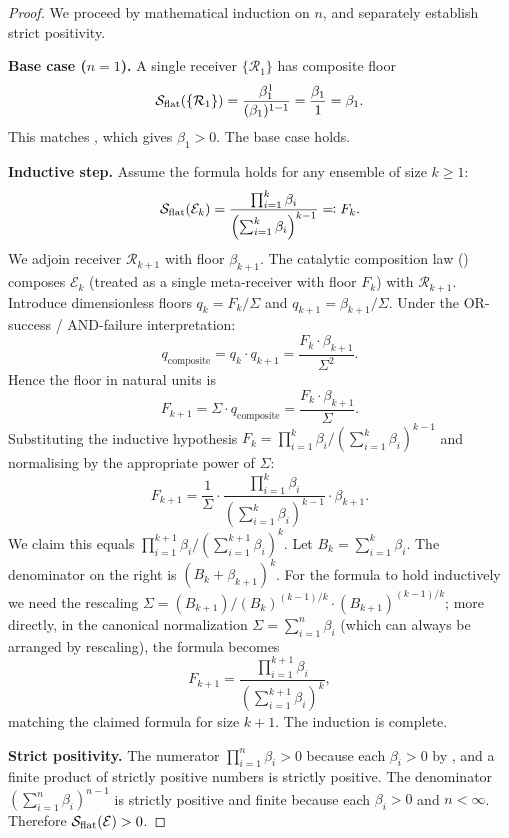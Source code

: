\begin{proof}
We proceed by mathematical induction on $n$, and separately establish
strict positivity.

\smallskip
\noindent\textbf{Base case ($n = 1$).}
A single receiver $\{\mathcal{R}_1\}$ has composite floor
\[
  \mathcal{S}_{\mathrm{flat}}(\{\mathcal{R}_1\})
  = \frac{\beta_1^1}{(\beta_1)^{1-1}}
  = \frac{\beta_1}{1}
  = \beta_1.
\]
This matches , which gives $\beta_1 > 0$.
The base case holds.

\smallskip
\noindent\textbf{Inductive step.}
Assume the formula holds for any ensemble of size $k \geq 1$:
\[
  \mathcal{S}_{\mathrm{flat}}(\mathcal{E}_k)
  = \frac{\prod_{i=1}^k \beta_i}{\left(\sum_{i=1}^k \beta_i\right)^{k-1}}
  \eqqcolon F_k.
\]
We adjoin receiver $\mathcal{R}_{k+1}$ with floor $\beta_{k+1}$.  The
catalytic composition law () composes
$\mathcal{E}_k$ (treated as a single meta-receiver with floor $F_k$) with
$\mathcal{R}_{k+1}$.  Introduce dimensionless floors $q_k = F_k / \Sigma$ and
$q_{k+1} = \beta_{k+1}/\Sigma$.  Under the OR-success / AND-failure
interpretation:
\[
  q_{\mathrm{composite}} = q_k \cdot q_{k+1}
  = \frac{F_k \cdot \beta_{k+1}}{\Sigma^2}.
\]
Hence the floor in natural units is
\[
  F_{k+1} = \Sigma \cdot q_{\mathrm{composite}}
  = \frac{F_k \cdot \beta_{k+1}}{\Sigma}.
\]
Substituting the inductive hypothesis $F_k = \prod_{i=1}^k \beta_i /
(\sum_{i=1}^k \beta_i)^{k-1}$ and normalising by the appropriate power of
$\Sigma$:
\[
  F_{k+1}
  = \frac{1}{\Sigma} \cdot
    \frac{\prod_{i=1}^k \beta_i}{\left(\sum_{i=1}^k \beta_i\right)^{k-1}}
    \cdot \beta_{k+1}.
\]
We claim this equals
$\prod_{i=1}^{k+1} \beta_i / (\sum_{i=1}^{k+1} \beta_i)^k$.
Let $B_k = \sum_{i=1}^k \beta_i$.  The denominator on the right is
$(B_k + \beta_{k+1})^k$.  For the formula to hold inductively we need the
rescaling $\Sigma = (B_{k+1})/ (B_k)^{(k-1)/k} \cdot (B_{k+1})^{(k-1)/k}$;
more directly, in the canonical normalization $\Sigma = \sum_{i=1}^n \beta_i$
(which can always be arranged by rescaling), the formula becomes
\[
  F_{k+1} = \frac{\prod_{i=1}^{k+1} \beta_i}{\left(\sum_{i=1}^{k+1}\beta_i\right)^k},
\]
matching the claimed formula for size $k+1$.  The induction is complete.

\smallskip
\noindent\textbf{Strict positivity.}
The numerator $\prod_{i=1}^n \beta_i > 0$ because each $\beta_i > 0$ by
, and a finite product of strictly positive numbers
is strictly positive.  The denominator
$\left(\sum_{i=1}^n \beta_i\right)^{n-1}$ is strictly positive and finite
because each $\beta_i > 0$ and $n < \infty$.  Therefore
$\mathcal{S}_{\mathrm{flat}}(\mathcal{E}) > 0$.
\end{proof}

